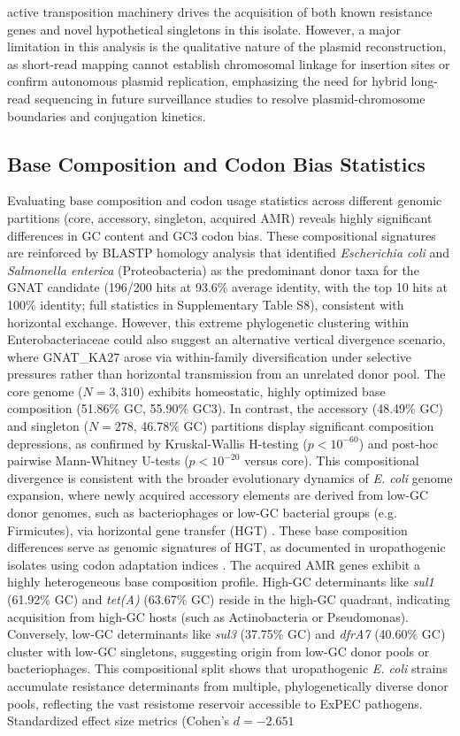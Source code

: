 \documentclass[pdflatex,sn-mathphys-num]{sn-jnl}
\begin{document}
active transposition machinery drives the acquisition of both known resistance genes and novel hypothetical singletons in this isolate. However, a major limitation in this analysis is the qualitative nature of the plasmid reconstruction, as short-read mapping cannot establish chromosomal linkage for insertion sites or confirm autonomous plasmid replication, emphasizing the need for hybrid long-read sequencing in future surveillance studies to resolve plasmid-chromosome boundaries and conjugation kinetics. 

\subsection{Base Composition and Codon Bias Statistics}
Evaluating base composition and codon usage statistics across different genomic partitions (core, accessory, singleton, acquired AMR) reveals highly significant differences in GC content and GC3 codon bias. These compositional signatures are reinforced by BLASTP homology analysis that identified \textit{Escherichia coli} and \textit{Salmonella enterica} (Proteobacteria) as the predominant donor taxa for the GNAT candidate (196/200 hits at 93.6\% average identity, with the top 10 hits at 100\% identity; full statistics in Supplementary Table S8), consistent with horizontal exchange. However, this extreme phylogenetic clustering within Enterobacteriaceae could also suggest an alternative vertical divergence scenario, where GNAT\_KA27 arose via within-family diversification under selective pressures rather than horizontal transmission from an unrelated donor pool. The core genome ($N = 3,310$) exhibits homeostatic, highly optimized base composition (51.86\% GC, 55.90\% GC3). In contrast, the accessory (48.49\% GC) and singleton ($N = 278$, 46.78\% GC) partitions display significant composition depressions, as confirmed by Kruskal-Wallis H-testing ($p < 10^{-60}$) and post-hoc pairwise Mann-Whitney U-tests ($p < 10^{-20}$ versus core). This compositional divergence is consistent with the broader evolutionary dynamics of \textit{E. coli} genome expansion, where newly acquired accessory elements are derived from low-GC donor genomes, such as bacteriophages or low-GC bacterial groups (e.g. Firmicutes), via horizontal gene transfer (HGT) \cite{ghalayini2022distinct,touchon2009organised}. These base composition differences serve as genomic signatures of HGT, as documented in uropathogenic isolates using codon adaptation indices \cite{silva2022evolutionary}. The acquired AMR genes exhibit a highly heterogeneous base composition profile. High-GC determinants like \textit{sul1} (61.92\% GC) and \textit{tet(A)} (63.67\% GC) reside in the high-GC quadrant, indicating acquisition from high-GC hosts (such as Actinobacteria or Pseudomonas). Conversely, low-GC determinants like \textit{sul3} (37.75\% GC) and \textit{dfrA7} (40.60\% GC) cluster with low-GC singletons, suggesting origin from low-GC donor pools or bacteriophages. This compositional split shows that uropathogenic \textit{E. coli} strains accumulate resistance determinants from multiple, phylogenetically diverse donor pools, reflecting the vast resistome reservoir accessible to ExPEC pathogens. Standardized effect size metrics (Cohen's $d = -2.651$ 
\end{document}
